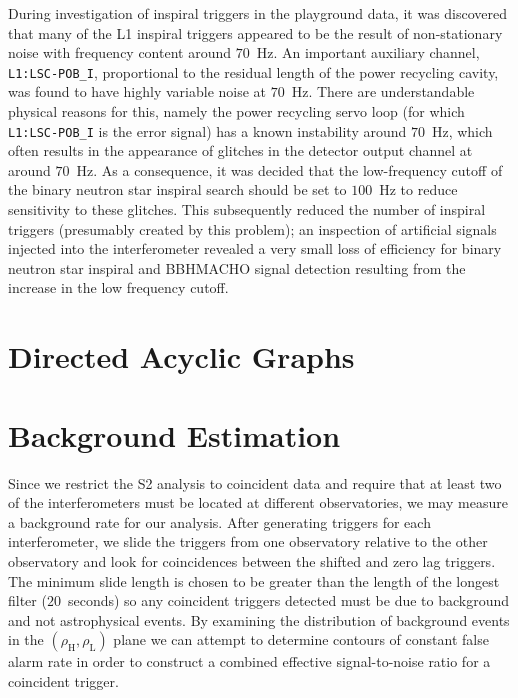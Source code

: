 During investigation of inspiral triggers in the playground data, it was
discovered that many of the L1 inspiral triggers appeared to be the result of
non-stationary noise with frequency content around $70$~Hz.  An important
auxiliary channel, \texttt{L1:LSC-POB\_I}, proportional to the residual length
of the power recycling cavity, was found to have highly variable noise at
$70$~Hz.  There are understandable physical reasons for this, namely the power
recycling servo loop (for which \texttt{L1:LSC-POB\_I} is the error signal)
has a known instability around $70$~Hz, which often results in the appearance
of glitches in the detector output channel at around $70$~Hz.  As a
consequence, it was decided that the low-frequency cutoff of the binary
neutron star inspiral search should be set to $100$~Hz to reduce sensitivity
to these glitches.  This subsequently reduced the number of inspiral triggers
(presumably created by this problem); an inspection of artificial signals
injected into the interferometer revealed a very small loss of efficiency for
binary neutron star inspiral and BBHMACHO signal detection resulting from the
increase in the low frequency cutoff.

\section{Directed Acyclic Graphs}
\label{s:dag}

\section{Background Estimation}
\label{s:background}

Since we restrict the S2 analysis to coincident data and require that at least
two of the interferometers must be located at different observatories, we may
measure a background rate for our analysis. After generating triggers for each
interferometer, we slide the triggers from one observatory relative to the
other observatory and look for coincidences between the shifted and zero lag
triggers. The minimum slide length is chosen to be greater than the length of
the longest filter ($20$~seconds) so any coincident triggers detected must be due to background and
not astrophysical events. By examining the distribution of background events
in the $(\rho_\mathrm{H},\rho_\mathrm{L})$ plane we can attempt to determine
contours of constant false alarm rate in order to construct a combined
effective signal-to-noise ratio for a coincident trigger\cite{abbott2004a}.

